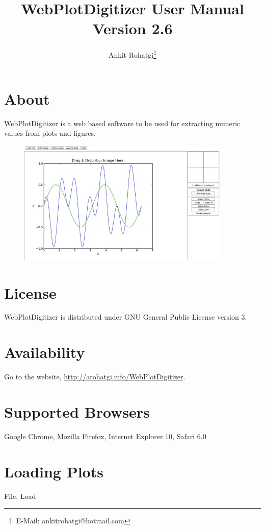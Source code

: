 \documentclass{article}
\begin{document}
\title{WebPlotDigitizer User Manual\\ Version 2.6}
\author{Ankit Rohatgi\footnote{E-Mail: ankitrohatgi@hotmail.com}}
\maketitle
\tableofcontents

\section{About}
WebPlotDigitizer is a web based software to be used for extracting numeric values from plots and figures.

\begin{figure}
\centering
\includegraphics[width=4in]{./figures/testSmall.jpg}
\end{figure}

\section{License}
WebPlotDigitizer is distributed under GNU General Public License version 3.
\section{Availability}
Go to the website, \url{http://arohatgi.info/WebPlotDigitizer}.
\section{Supported Browsers}
Google Chrome, Mozilla Firefox, Internet Explorer 10, Safari 6.0
\section{Loading Plots}
File, Load
\end{document}
